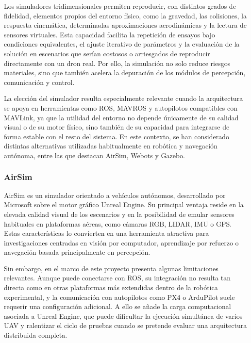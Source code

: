 \vspace{0.4cm}

Los simuladores tridimensionales permiten reproducir, con distintos grados de fidelidad, elementos propios del entorno físico, como la gravedad, las colisiones, la respuesta cinemática, determinadas aproximaciones aerodinámicas y la lectura de sensores virtuales. Esta capacidad facilita la repetición de ensayos bajo condiciones equivalentes, el ajuste iterativo de parámetros y la evaluación de la solución en escenarios que serían costosos o arriesgados de reproducir directamente con un dron real. Por ello, la simulación no solo reduce riesgos materiales, sino que también acelera la depuración de los módulos de percepción, comunicación y control.

\vspace{0.4cm}

La elección del simulador resulta especialmente relevante cuando la arquitectura se apoya en herramientas como ROS, MAVROS y autopilotos compatibles con MAVLink, ya que la utilidad del entorno no depende únicamente de su calidad visual o de su motor físico, sino también de su capacidad para integrarse de forma estable con el resto del sistema. En este contexto, se han considerado distintas alternativas utilizadas habitualmente en robótica y navegación autónoma, entre las que destacan AirSim, Webots y Gazebo.



\subsubsection{AirSim}

AirSim es un simulador orientado a vehículos autónomos, desarrollado por Microsoft sobre el motor gráfico Unreal Engine. Su principal ventaja reside en la elevada calidad visual de los escenarios y en la posibilidad de emular sensores habituales en plataformas aéreas, como cámaras RGB, LIDAR, IMU o GPS. Estas características lo convierten en una herramienta atractiva para investigaciones centradas en visión por computador, aprendizaje por refuerzo o navegación basada principalmente en percepción.

\vspace{0.4cm}

Sin embargo, en el marco de este proyecto presenta algunas limitaciones relevantes. Aunque puede conectarse con ROS, su integración no resulta tan directa como en otras plataformas más extendidas dentro de la robótica experimental, y la comunicación con autopilotos como PX4 o ArduPilot suele requerir una configuración adicional. A ello se añade la carga computacional asociada a Unreal Engine, que puede dificultar la ejecución simultánea de varios UAV y ralentizar el ciclo de pruebas cuando se pretende evaluar una arquitectura distribuida completa.

